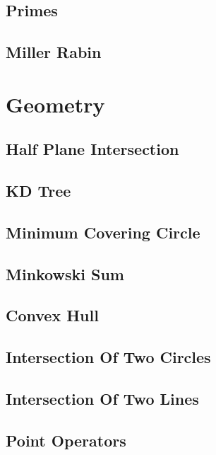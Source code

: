 \subsection{Primes}

\subsection{Miller Rabin}

\section{Geometry}
\subsection{Half Plane Intersection}

\subsection{KD Tree}

\subsection{Minimum Covering Circle}

\subsection{Minkowski Sum}

\subsection{Convex Hull}

\subsection{Intersection Of Two Circles}

\subsection{Intersection Of Two Lines}

\subsection{Point Operators}

